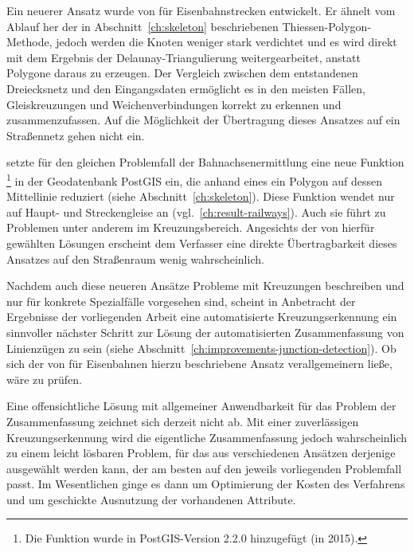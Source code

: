 \documentclass[../main/thesis.tex]{subfiles}
\begin{document}
Ein neuerer Ansatz wurde von \citeauthor{CTGV14} für Eisenbahnstrecken entwickelt.
Er ähnelt vom Ablauf her der in Abschnitt~\ref{ch:skeleton} beschriebenen Thiessen-Polygon-Methode, jedoch werden die Knoten weniger stark verdichtet und es wird direkt mit dem Ergebnis der Delaunay-Triangulierung weitergearbeitet, anstatt Polygone daraus zu erzeugen.
Der Vergleich zwischen dem entstandenen Dreiecksnetz und den Eingangsdaten ermöglicht es in den meisten Fällen, Gleiskreuzungen und Weichenverbindungen korrekt zu erkennen und zusammenzufassen.
Auf die Möglichkeit der Übertragung dieses Ansatzes auf ein Straßennetz gehen \citeauthor{CTGV14} nicht ein. 

 setzte für den gleichen Problemfall der Bahnachsenermittlung eine neue Funktion%
\footnote{Die Funktion  wurde in PostGIS-Version 2.2.0 hinzugefügt (in 2015).}
in der Geodatenbank PostGIS ein, die anhand eines  ein Polygon auf dessen Mittellinie reduziert (siehe Abschnitt~\ref{ch:skeleton}).
Diese Funktion wendet \citeauthor{Mat17} nur auf Haupt- und Streckengleise an (vgl.~\ref{ch:result-railways}).
Auch sie führt zu Problemen unter anderem im Kreuzungsbereich.
Angesichts der von \citeauthor{Mat17} hierfür gewählten Lösungen erscheint dem Verfasser eine direkte Übertragbarkeit dieses Ansatzes auf den Straßenraum wenig wahrscheinlich. 

Nachdem auch diese neueren Ansätze Probleme mit Kreuzungen beschreiben und nur für konkrete Spezialfälle vorgesehen sind, scheint in Anbetracht der Ergebnisse der vorliegenden Arbeit eine automatisierte Kreuzungserkennung
ein sinnvoller nächster Schritt zur Lösung der automatisierten Zusammenfassung von Linienzügen zu sein (siehe Abschnitt~\ref{ch:improvements-junction-detection}).
Ob sich der von \citeauthor{CTGV14} für Eisenbahnen hierzu beschriebene Ansatz verallgemeinern ließe, wäre zu prüfen.

Eine offensichtliche Lösung mit allgemeiner Anwendbarkeit für das Problem der Zusammenfassung zeichnet sich derzeit nicht ab.
Mit einer zuverlässigen Kreuzungserkennung wird die eigentliche Zusammenfassung jedoch wahrscheinlich zu einem leicht lösbaren Problem, für das aus verschiedenen Ansätzen derjenige ausgewählt werden kann, der am besten auf den jeweils vorliegenden Problemfall passt.
Im Wesentlichen ginge es dann um Optimierung der Kosten des Verfahrens und um geschickte Ausnutzung der vorhandenen Attribute. 
\end{document}
